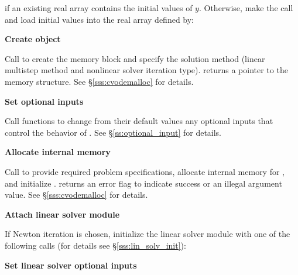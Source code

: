 \begin{Steps}
  {\s} 

  {\p} 

  if an existing real array  contains the initial values of $y$.  
  Otherwise, make the call  and load 
  initial values into the real array defined by:

  {\s} 

  {\p} 
  
\item\label{i:cvode_create} 
  {\bf Create {\cvode} object}

  Call  
  to create the {\cvode} memory block and specify the solution method
  (linear multistep method and nonlinear solver iteration type).
   returns a pointer to the {\cvode} memory structure.
  See \S\ref{sss:cvodemalloc} for details.

\item
  {\bf Set optional inputs}

  Call  functions to change from their default values any
  optional inputs that control the behavior of {\cvode}.
  See \S\ref{ss:optional_input} for details.

\item\label{i:cvode_malloc} 
  {\bf Allocate internal memory}

  Call  
  to provide required problem specifications,
  allocate internal memory for {\cvode}, 
  and initialize {\cvode}.
   returns an error flag to indicate success or an illegal argument value.
  See \S\ref{sss:cvodemalloc} for details.
  
\item\label{i:lin_solver} 
  {\bf Attach linear solver module}

  If Newton iteration is chosen, initialize the linear solver module
  with one of the following calls (for details see \S\ref{sss:lin_solv_init}):

  {\s} 

  {\s} 


  
\item
  {\bf Set linear solver optional inputs}


\end{Steps}
